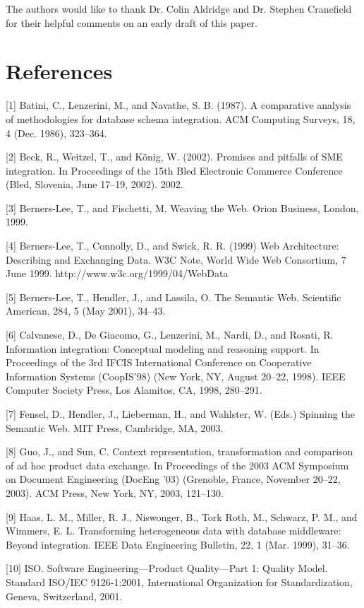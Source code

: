 \documentclass{CRPITStyle}
\begin{document}
The authors would like to thank Dr. Colin Aldridge and Dr. Stephen
Cranefield for their helpful comments on an early draft of this paper.


\section{References}

[1]	Batini, C., Lenzerini, M., and Navathe, S. B. (1987). A
comparative analysis of methodologies for database schema integration.
ACM Computing Surveys, 18, 4 (Dec. 1986), 323--364.

[2]	Beck, R., Weitzel, T., and K\"{o}nig, W. (2002). Promises and
pitfalls of SME integration. In Proceedings of the 15th Bled Electronic
Commerce Conference (Bled, Slovenia, June 17--19, 2002). 2002.

[3]	Berners-Lee, T., and Fischetti, M. Weaving the Web. Orion
Business, London, 1999.

[4]	Berners-Lee, T., Connolly, D., and Swick, R. R. (1999) Web
Architecture: Describing and Exchanging Data. W3C Note, World Wide Web
Consortium, 7 June 1999. http://www.w3c.org/1999/04/WebData

[5]	Berners-Lee, T., Hendler, J., and Lassila, O. The Semantic Web.
Scientific American, 284, 5 (May 2001), 34--43.

[6]	Calvanese, D., De Giacomo, G., Lenzerini, M., Nardi, D., and
Rosati, R. Information integration: Conceptual modeling and reasoning
support. In Proceedings of the 3rd IFCIS International Conference on
Cooperative Information Systems (CoopIS'98) (New York, NY, August 20--22,
1998). IEEE Computer Society Press, Los Alamitos, CA, 1998, 280--291.

[7]	Fensel, D., Hendler, J., Lieberman, H., and Wahlster, W. (Eds.)
Spinning the Semantic Web. MIT Press, Cambridge, MA, 2003.

[8]	Guo, J., and Sun, C. Context representation, transformation and
comparison of ad hoc product data exchange. In Proceedings of the 2003
ACM Symposium on Document Engineering (DocEng '03) (Grenoble, France,
November 20--22, 2003). ACM Press, New York, NY, 2003, 121--130.

[9]	Haas, L. M., Miller, R. J., Niswonger, B., Tork Roth, M.,
Schwarz, P. M., and Wimmers, E. L. Transforming heterogeneous data with
database middleware: Beyond integration. IEEE Data Engineering Bulletin,
22, 1 (Mar. 1999), 31--36.

[10]	ISO. Software Engineering---Product Quality---Part 1: Quality Model.
Standard ISO/IEC 9126-1:2001, International Organization for
Standardization, Geneva, Switzerland, 2001.
\end{document}
